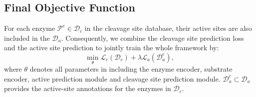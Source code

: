 







\subsection{Final Objective Function}
For each enzyme $\mathcal{P}^e \in \mathcal{D}_c$ in the cleavage site database, their active sites are also included in the $\mathcal{D}_a$. Consequently, we combine the cleavage site prediction loss and the active site prediction to jointly train the whole framework by:
\begin{equation}
    \min_{\theta} \mathcal{L}_c(\mathcal{D}_c) + \lambda \mathcal{L}_a(\mathcal{D}_a^c),
    \label{eq:lossall}
\end{equation}
where $\theta$ denotes all parameters in {\method} including the enzyme encoder, substrate encoder, active prediction module and cleavage site prediction module. $\mathcal{D}_a^c \subset \mathcal{D}_a$ provides the active-site annotations for the enzymes in $\mathcal{D}_c$.



